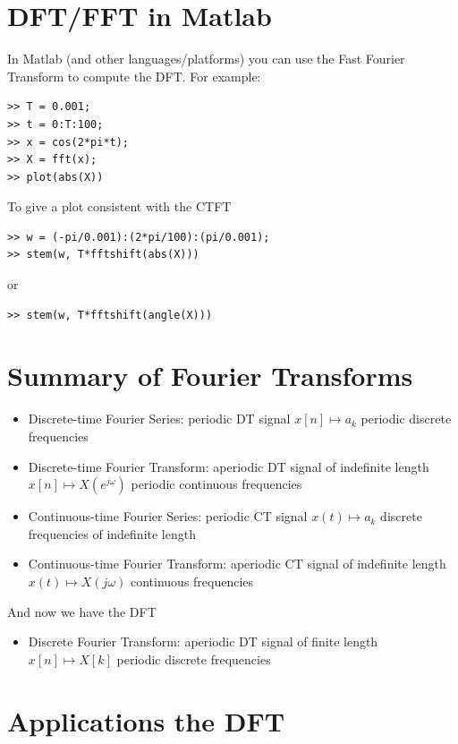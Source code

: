 \section{DFT/FFT in Matlab}

In Matlab (and other languages/platforms) you can use the Fast Fourier Transform to compute the DFT. For example:

\begin{verbatim}
>> T = 0.001;
>> t = 0:T:100;
>> x = cos(2*pi*t);
>> X = fft(x);
>> plot(abs(X))
\end{verbatim}
To give a plot consistent with the CTFT
\begin{verbatim}
>> w = (-pi/0.001):(2*pi/100):(pi/0.001);
>> stem(w, T*fftshift(abs(X)))
\end{verbatim}
or
\begin{verbatim}
>> stem(w, T*fftshift(angle(X)))
\end{verbatim}


\section{Summary of Fourier Transforms}

\begin{itemize}
\item Discrete-time Fourier Series: periodic DT signal $x[n] \mapsto a_k$ periodic discrete frequencies
\item Discrete-time Fourier Transform: aperiodic DT signal of indefinite length $x[n] \mapsto X(e^{j\omega})$ periodic continuous frequencies
\item Continuous-time Fourier Series: periodic CT signal  $x(t) \mapsto a_k$ discrete frequencies of indefinite length
\item Continuous-time Fourier Transform: aperiodic CT signal of indefinite length  $x(t) \mapsto X(j\omega)$ continuous frequencies 
\end{itemize}

And now we have the DFT
\begin{itemize}
\item Discrete Fourier Transform: aperiodic DT signal of finite length $x[n] \mapsto X[k]$ periodic discrete frequencies
\end{itemize}

\section{Applications the DFT}

